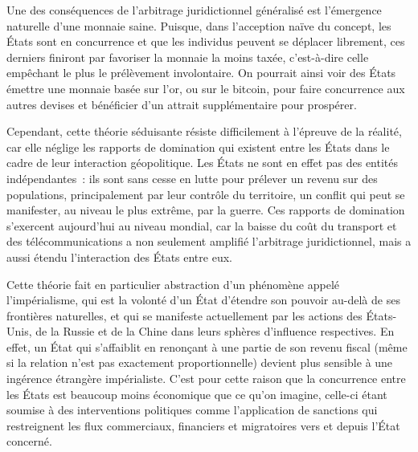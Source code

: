 Une des conséquences de l'arbitrage juridictionnel généralisé est l'émergence naturelle d'une monnaie saine. Puisque, dans l'acception naïve du concept, les États sont en concurrence et que les individus peuvent se déplacer librement, ces derniers finiront par favoriser la monnaie la moins taxée, c'est-à-dire celle empêchant le plus le prélèvement involontaire. On pourrait ainsi voir des États émettre une monnaie basée sur l'or, ou sur le bitcoin, pour faire concurrence aux autres devises et bénéficier d'un attrait supplémentaire pour prospérer.


Cependant, cette théorie séduisante résiste difficilement à l'épreuve de la réalité, car elle néglige les rapports de domination qui existent entre les États dans le cadre de leur interaction géopolitique. Les États ne sont en effet pas des entités indépendantes~: ils sont sans cesse en lutte pour prélever un revenu sur des populations, principalement par leur contrôle du territoire, un conflit qui peut se manifester, au niveau le plus extrême, par la guerre. Ces rapports de domination s'exercent aujourd'hui au niveau mondial, car la baisse du coût du transport et des télécommunications a non seulement amplifié l'arbitrage juridictionnel, mais a aussi étendu l'interaction des États entre eux.

Cette théorie fait en particulier abstraction d'un phénomène appelé l'impérialisme, qui est la volonté d'un État d'étendre son pouvoir au-delà de ses frontières naturelles, et qui se manifeste actuellement par les actions des États-Unis, de la Russie et de la Chine dans leurs sphères d'influence respectives. En effet, un État qui s'affaiblit en renonçant à une partie de son revenu fiscal (même si la relation n'est pas exactement proportionnelle) devient plus sensible à une ingérence étrangère impérialiste. C'est pour cette raison que la concurrence entre les États est beaucoup moins économique que ce qu'on imagine, celle-ci étant soumise à des interventions politiques comme l'application de sanctions qui restreignent les flux commerciaux, financiers et migratoires vers et depuis l'État concerné. %

